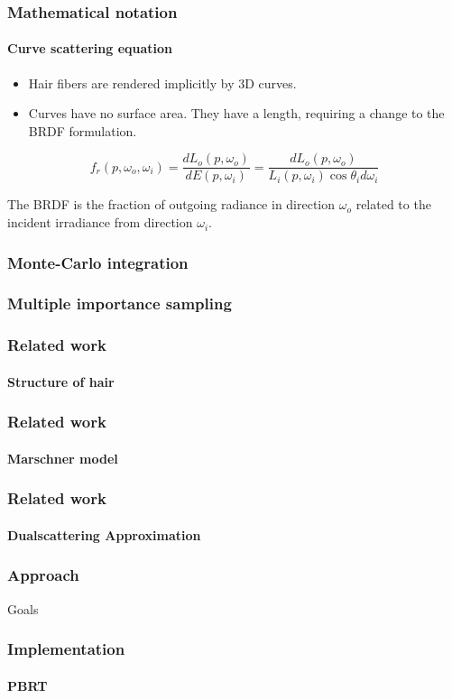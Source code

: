 \documentclass{beamer}
\begin{document}
  
\begin{frame}
    \frametitle{Mathematical notation}
	\framesubtitle{Curve scattering equation}
	
	\begin{itemize}
	\item Hair fibers are rendered implicitly by 3D curves.
	\item Curves have no surface area. They have a length, requiring a change to the BRDF formulation.
	\end{itemize}
	
	\begin{equation}
	f_r(p, \omega_o, \omega_i) = \frac{dL_o(p, \omega_o)}{dE(p, \omega_i)} = \frac{dL_o(p, \omega_o)}{L_i(p, \omega_i) \cos \theta_i d\omega_i}
	\end{equation}
	
	The BRDF is the fraction of outgoing radiance in direction $\omega_o$ related to the incident irradiance from direction $\omega_i$.

  \end{frame}  
  
  
  
  \begin{frame}
    \frametitle{Monte-Carlo integration}
  \end{frame}
  
  \begin{frame}
    \frametitle{Multiple importance sampling}
  \end{frame}

  
  \begin{frame}
    \frametitle{Related work}
	\framesubtitle{Structure of hair}
  \end{frame}
  
  
  \begin{frame}
    \frametitle{Related work}
    \framesubtitle{Marschner model}
  \end{frame}
  
  \begin{frame}
    \frametitle{Related work}
    \framesubtitle{Dualscattering Approximation}
  \end{frame}
  
  
  \begin{frame}
    \frametitle{Approach}
	Goals
  \end{frame}
  
  
  \begin{frame}
    \frametitle{Implementation}
    \framesubtitle{PBRT}
  \end{frame}
  
\end{document}
